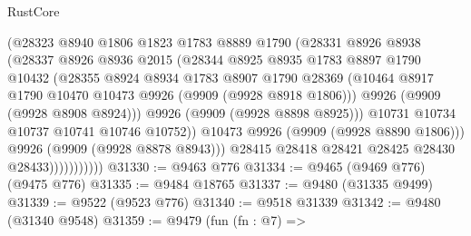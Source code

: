 \begin{lexlean}{RustCore}
\begin{coremodule}
                            (@28323
                              @8940
                              @1806
                              @1823
                              @1783
                              @8889
                              @1790
                              (@28331
                                @8926
                                @8938
                                (@28337
                                  @8926
                                  @8936
                                  @2015
                                  (@28344
                                    @8925
                                    @8935
                                    @1783
                                    @8897
                                    @1790
                                    @10432
                                    (@28355
                                      @8924
                                      @8934
                                      @1783
                                      @8907
                                      @1790
                                      @28369
                                      (@10464
                                        @8917
                                        @1790
                                        @10470
                                        @10473
                                        @9926
                                        (@9909 (@9928 @8918 @1806)))
                                      @9926
                                      (@9909 (@9928 @8908 @8924)))
                                    @9926
                                    (@9909 (@9928 @8898 @8925)))
                                  @10731
                                  @10734
                                  @10737
                                  @10741
                                  @10746
                                  @10752))
                              @10473
                              @9926
                              (@9909 (@9928 @8890 @1806)))
                            @9926
                            (@9909 (@9928 @8878 @8943)))
                          @28415
                          @28418
                          @28421
                          @28425
                          @28430
                          @28433)))))))))))
@31330 := @9463 @776
@31334 := @9465 (@9469 @776) (@9475 @776)
@31335 := @9484 @18765
@31337 := @9480 (@31335 @9499)
@31339 := @9522 (@9523 @776)
@31340 := @9518 @31339
@31342 := @9480 (@31340 @9548)
@31359 := @9479
    (fun (fn : @7) =>

\end{coremodule}
\end{lexlean}
